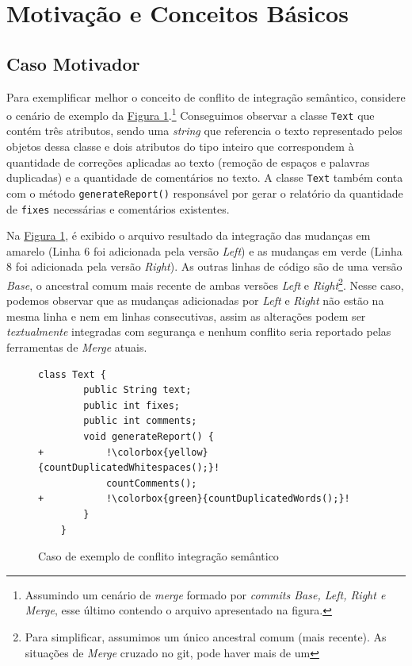 \section{Motivação e Conceitos Básicos}
\subsection{Caso Motivador}
Para exemplificar melhor o conceito de conflito de integração semântico, considere o cenário de exemplo da \hyperref[fig:codigo-motivador]{Figura 1}.\footnote{Assumindo um cenário de \emph{merge} formado por \emph{commits Base, Left, Right e Merge}, esse último contendo o arquivo apresentado na figura.} Conseguimos observar a classe \texttt{Text} que contém três atributos, sendo uma \emph{string} que referencia o texto representado pelos objetos dessa classe e dois atributos do tipo inteiro que correspondem à quantidade de correções aplicadas ao texto (remoção de espaços e palavras duplicadas) e a quantidade de comentários no texto. A classe \texttt{Text} também conta com o método \texttt{generateReport()} responsável por gerar o relatório da quantidade de \texttt{fixes} necessárias e comentários existentes.

Na \hyperref[fig:codigo-motivador]{Figura 1}, é exibido o arquivo resultado da integração das mudanças em amarelo (Linha 6 foi adicionada pela versão \emph{Left}) e as mudanças em verde (Linha 8 foi adicionada pela versão \emph{Right}). As outras linhas de código são de uma versão \emph{Base}, o ancestral comum mais recente de ambas versões \emph{Left} e \emph{Right}\footnote{Para simplificar, assumimos um único ancestral comum (mais recente). As situações de \emph{Merge} cruzado no git, pode haver mais de um}. Nesse caso, podemos observar que as mudanças adicionadas por \emph{Left} e \emph{Right} não estão na mesma linha e nem em linhas consecutivas, assim as alterações podem ser \emph{textualmente} integradas com segurança e nenhum conflito seria reportado pelas ferramentas de \emph{Merge} atuais. 

\begin{figure}[!h]
    \begin{lstlisting}[escapechar=!]
    class Text {
        public String text;
        public int fixes;
        public int comments;
        void generateReport() {
+           !\colorbox{yellow}{countDuplicatedWhitespaces();}!
            countComments();
+           !\colorbox{green}{countDuplicatedWords();}!
        }
    }
    \end{lstlisting}
    \caption{Caso de exemplo de conflito integração semântico}
    \label{fig:codigo-motivador}
\end{figure}

